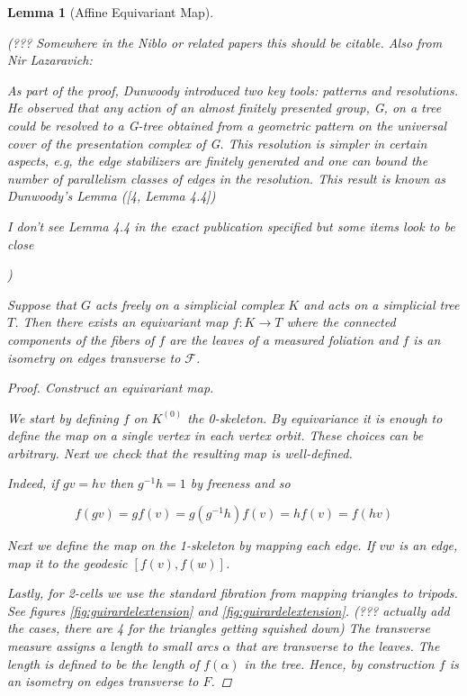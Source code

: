 \documentclass[12pt,parskip=full]{report}
\theoremstyle{plain}
\newtheorem{lem}[thm]{Lemma}
\theoremstyle{definition}
\begin{document}
\begin{lem}
    [Affine Equivariant Map]
    \label{lem:affineequivariantmap} 
    
    (??? Somewhere in the Niblo or related papers this should be citable. Also from Nir Lazaravich:
    
        As part of the proof, Dunwoody introduced two key tools: patterns and resolutions. He observed
        that any action of an almost finitely presented group, G, on a tree could be resolved to a G-tree
        obtained from a geometric pattern on the universal cover of the presentation complex of G. This
        resolution is simpler in certain aspects, e.g, the edge stabilizers are finitely generated and one
        can bound the number of parallelism classes of edges in the resolution. This result is known as
        Dunwoody’s Lemma ([4, Lemma 4.4])
        
        I don't see Lemma 4.4 in the exact publication specified but some items look to be close


    )


    Suppose that \(G\) acts freely on a simplicial complex \(K\) and acts on a simplicial tree \(T\). Then there exists an equivariant map \(f: K \to T\) where the connected components of the fibers of \(f\) are the leaves of a measured foliation and \(f\) is an isometry on edges transverse to \(\mathscr{F}\).
    \begin{proof}
        Construct an equivariant map.

        We start by defining \(f\) on \(K^{(0)}\) the 0-skeleton. By equivariance it is enough to define the map on a single vertex in each vertex orbit. These choices can be arbitrary. Next we check that the resulting map is well-defined. 
        
        Indeed, if \(gv=hv\) then \(g^{-1} h = 1\) by freeness and so
        
        \[ f(gv) = gf(v) = g(g^{-1}h)f(v) = hf(v) = f(hv) \]
        
        Next we define the map on the 1-skeleton by mapping each edge. If \(vw\) is an edge, map it to the geodesic \([f(v), f(w)]\). 
        
        Lastly, for 2-cells we use the standard fibration from mapping triangles to tripods. See figures \ref{fig:guirardelextension} and \ref{fig:guirardelextension}. (??? actually add the cases, there are 4 for the triangles getting squished down) The transverse measure assigns a length to small arcs \(\alpha\) that are transverse to the leaves. The length is defined to be the length of \(f(\alpha)\) in the tree. Hence, by construction \(f\) is an isometry on edges transverse to \(F\).
    \end{proof}
\end{lem}
\end{document}
